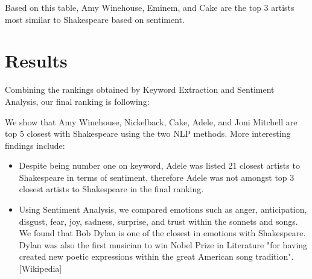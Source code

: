 \documentclass[10pt,a4paper]{article}
\begin{document}
Based on this table, Amy Winehouse, Eminem, and Cake are the top 3 artists most similar to Shakespeare based on sentiment.

\section{Results}

Combining the rankings obtained by Keyword Extraction and Sentiment Analysis, our final ranking is following:

\begin{table}[ht]
\centering
{}
\caption{Ranked Top 10 Most Similar Music Artist to Shakespeare} 
\label{tab:overallranktable}
\end{table}


We show that Amy Winehouse, Nickelback, Cake, Adele, and Joni Mitchell are top 5 closest with Shakespeare using the two NLP methods. More interesting findings include:

\begin{itemize}

\item Despite being number one on keyword, Adele was listed 21 closest artists to Shakespeare in terms of sentiment, therefore Adele was not amongst top 3 closest artists to Shakespeare in the final ranking.
\item Using Sentiment Analysis, we compared emotions such as anger, anticipation, disgust, fear, joy, sadness, surprise, and trust within the sonnets and songs. We found that Bob Dylan is one of the closest in emotions with Shakespeare. Dylan was also the first musician to win Nobel Prize in Literature "for having created new poetic expressions within the great American song tradition". [Wikipedia]

\end{itemize}
\end{document}
